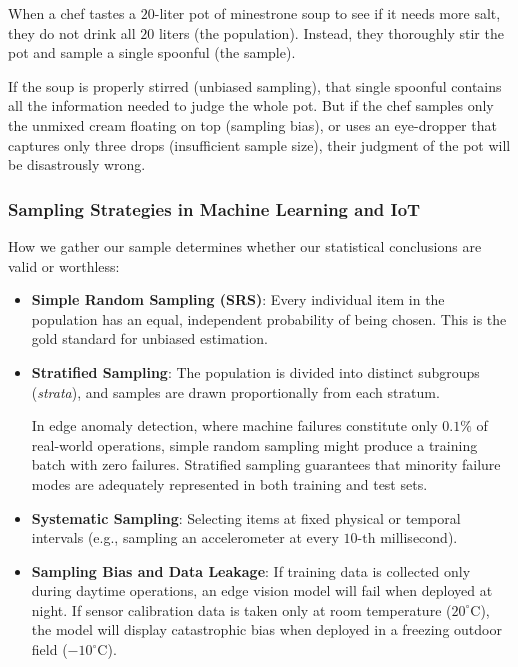 \begin{analogy}
When a chef tastes a $20$-liter pot of minestrone soup to see if it needs more salt, they do not drink all $20$ liters (the population). Instead, they thoroughly stir the pot and sample a single spoonful (the sample). 

If the soup is properly stirred (unbiased sampling), that single spoonful contains all the information needed to judge the whole pot. But if the chef samples only the unmixed cream floating on top (sampling bias), or uses an eye-dropper that captures only three drops (insufficient sample size), their judgment of the pot will be disastrously wrong.
\end{analogy}

\subsubsection{Sampling Strategies in Machine Learning and IoT}
How we gather our sample determines whether our statistical conclusions are valid or worthless:
\begin{itemize}
    \item \textbf{Simple Random Sampling (SRS)}: Every individual item in the population has an equal, independent probability of being chosen. This is the gold standard for unbiased estimation.
    \item \textbf{Stratified Sampling}: The population is divided into distinct subgroups (\textit{strata}), and samples are drawn proportionally from each stratum. 
    
    In edge anomaly detection, where machine failures constitute only $0.1\%$ of real-world operations, simple random sampling might produce a training batch with zero failures. Stratified sampling guarantees that minority failure modes are adequately represented in both training and test sets.
    \item \textbf{Systematic Sampling}: Selecting items at fixed physical or temporal intervals (e.g., sampling an accelerometer at every $10\text{-th}$ millisecond).
    \item \textbf{Sampling Bias and Data Leakage}: If training data is collected only during daytime operations, an edge vision model will fail when deployed at night. If sensor calibration data is taken only at room temperature ($20^\circ\text{C}$), the model will display catastrophic bias when deployed in a freezing outdoor field ($ -10^\circ\text{C}$).
\end{itemize}

